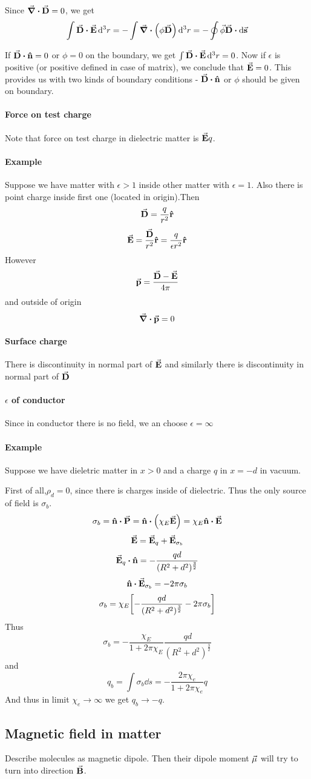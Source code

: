 Since $\div{\va{D}} = 0$, we get
$$\int \va{D}\vdot \va{E} \dd[3]{r} = -\int \div(\phi\va{D}) \dd[3]{r} =-\oint \va{\phi} \va{D} \vdot \dd{\va{s}}$$

If $\va{D} \vdot \vu{n} = 0 $ or $\phi=0$ on the boundary, we get $\int \va{D}\vdot \va{E} \dd[3]{r} = 0$. Now if $\epsilon$ is positive (or positive defined in case of matrix), we conclude that $\va{E}=0$. This provides us with two kinds of boundary conditions - $\va{D} \vdot \vu{n} $ or $\phi$ should be given on boundary.

\paragraph{Force on test charge}
Note that force on test charge in dielectric matter is $\va{E}q$.
\paragraph{Example}
Suppose we have matter with $\epsilon>1$ inside other matter with $\epsilon=1$. Also there is point charge inside first one (located in origin).Then
$$\va{D}= \frac{q}{r^2}\vu{r}$$
$$\va{E} = \frac{\va{D}}{r^2}\vu{r}= \frac{q}{\epsilon r^2}\vu{r}$$
However
$$\va{p} = \frac{\va{D} - \va{E}}{4\pi}$$
and outside of origin
$$\div{\va{p}} = 0$$
\paragraph{Surface charge}
There is discontinuity in normal part of $\va{E}$ and similarly there is discontinuity in normal part of $\va{D}$
\paragraph{$\epsilon$ of conductor}
Since in conductor there is no field, we an choose $\epsilon=\infty$ 
\paragraph{Example}
Suppose we have dieletric matter in $x>0$ and a charge $q$ in $x=-d$ in vacuum.

First of all,$\rho_d = 0$, since there is charges inside of dielectric. Thus the only source of field is $\sigma_b$.
$$\sigma_b = \vu{n} \vdot \va{P} = \vu{n} \vdot \qty(\chi_E \va{E}) = \chi_E \vu{n} \vdot \va{E}$$
$$\va{E} = \va{E}_q + \va{E}_{\sigma_b}$$
$$\va{E}_q \vdot \vu{n}= -\frac{qd}{(R^2+d^2)^{\frac{3}{2}}}$$
$$\vu{n} \vdot \va{E}_{\sigma_b} = -2\pi \sigma_b$$
$$\sigma_b = \chi_E \qty[ -\frac{qd}{(R^2+d^2)^{\frac{3}{2}}} -  2\pi \sigma_b ]$$
Thus
$$\sigma_b = -\frac{\chi_E}{1+2\pi \chi_E} \frac{qd}{(R^2+d^2)^{\frac{3}{2}}} $$
and
$$q_b = \int \sigma_b \dd{s} = -\frac{2\pi \chi_e}{1+2\pi \chi_e} q$$
And thus in limit $\chi_e \to \infty $ we get $q_b \to -q$.

\subsection{Magnetic field in matter}
Describe molecules as magnetic dipole. Then their dipole moment $\va{\mu}$ will try to turn into direction $\va{B}$. 